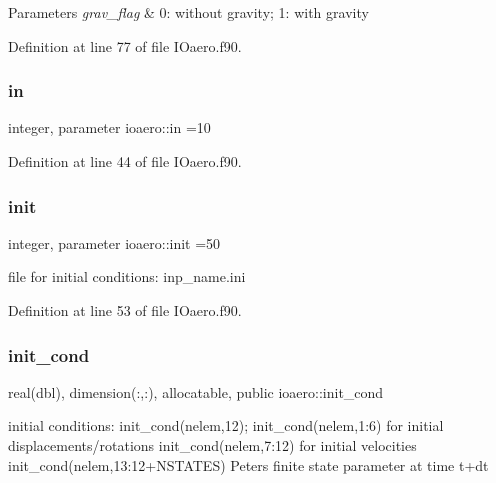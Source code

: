 \begin{DoxyParams}{Parameters}
{\em grav\+\_\+flag} & 0\+: without gravity; 1\+: with gravity \\
\hline
\end{DoxyParams}


Definition at line 77 of file I\+Oaero.\+f90.

\mbox{\label{namespaceioaero_a09d53f15b1a2c723ad2b4df01c16bccc}} 
\subsubsection{\texorpdfstring{in}{in}}
{\footnotesize\ttfamily integer, parameter ioaero\+::in =10\hspace{0.3cm}{\ttfamily [private]}}



Definition at line 44 of file I\+Oaero.\+f90.

\mbox{\label{namespaceioaero_afb3050696f2887599d4083672103b6e7}} 
\subsubsection{\texorpdfstring{init}{init}}
{\footnotesize\ttfamily integer, parameter ioaero\+::init =50\hspace{0.3cm}{\ttfamily [private]}}



file for initial conditions\+: inp\+\_\+name.\+ini 



Definition at line 53 of file I\+Oaero.\+f90.

\mbox{\label{namespaceioaero_ad88d83709eb2f4596a89098db11ba770}} 
\subsubsection{\texorpdfstring{init\+\_\+cond}{init\_cond}}
{\footnotesize\ttfamily real(dbl), dimension(\+:,\+:), allocatable, public ioaero\+::init\+\_\+cond}



initial conditions\+: init\+\_\+cond(nelem,12); init\+\_\+cond(nelem,1\+:6) for initial displacements/rotations init\+\_\+cond(nelem,7\+:12) for initial velocities init\+\_\+cond(nelem,13\+:12+\+N\+S\+T\+A\+T\+ES) Peters finite state parameter at time t+dt 



